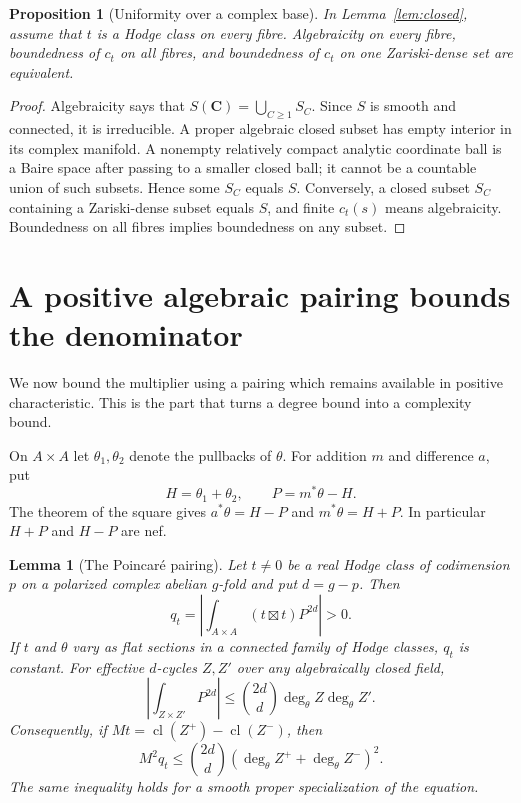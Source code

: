 \documentclass[11pt]{article}
\newtheorem{proposition}[theorem]{Proposition}
\newtheorem{lemma}[theorem]{Lemma}
\theoremstyle{definition}
\theoremstyle{remark}
\newcommand{\C}{\mathbf C}
\newcommand{\cl}{\operatorname{cl}}
\begin{document}
\begin{proposition}[Uniformity over a complex base]\label{prop:complex}
In Lemma~\ref{lem:closed}, assume that $t$ is a Hodge class on every fibre. Algebraicity on every fibre, boundedness of $c_t$ on all fibres, and boundedness of $c_t$ on one Zariski-dense set are equivalent.
\end{proposition}

\begin{proof}
Algebraicity says that $S(\C)=\bigcup_{C\geq1}S_C$. Since $S$ is smooth and connected, it is irreducible. A proper algebraic closed subset has empty interior in its complex manifold. A nonempty relatively compact analytic coordinate ball is a Baire space after passing to a smaller closed ball; it cannot be a countable union of such subsets. Hence some $S_C$ equals $S$. Conversely, a closed subset $S_C$ containing a Zariski-dense subset equals $S$, and finite $c_t(s)$ means algebraicity. Boundedness on all fibres implies boundedness on any subset.
\end{proof}

\section{A positive algebraic pairing bounds the denominator}
\label{sec:positive}

We now bound the multiplier using a pairing which remains available in positive characteristic. This is the part that turns a degree bound into a complexity bound.

On $A\times A$ let $\theta_1,\theta_2$ denote the pullbacks of $\theta$. For addition $m$ and difference $a$, put
\[
 H=\theta_1+\theta_2,\qquad P=m^*\theta-H.
\]
The theorem of the square gives $a^*\theta=H-P$ and $m^*\theta=H+P$. In particular $H+P$ and $H-P$ are nef.

\begin{lemma}[The Poincar\'e pairing]\label{lem:positive}
Let $t\ne0$ be a real Hodge class of codimension $p$ on a polarized complex abelian $g$-fold and put $d=g-p$. Then
\[
 q_t=\left|\int_{A\times A}(t\boxtimes t)P^{2d}\right|>0.
\]
If $t$ and $\theta$ vary as flat sections in a connected family of Hodge classes, $q_t$ is constant. For effective $d$-cycles $Z,Z'$ over any algebraically closed field,
\begin{equation}\label{eq:nef}
 \left|\int_{Z\times Z'}P^{2d}\right|
 \leq \binom{2d}{d}\deg_\theta Z\deg_\theta Z'.
\end{equation}
Consequently, if $Mt=\cl(Z^+)-\cl(Z^-)$, then
\begin{equation}\label{eq:denominator}
 M^2q_t\leq \binom{2d}{d}
       (\deg_\theta Z^++\deg_\theta Z^-)^2.
\end{equation}
The same inequality holds for a smooth proper specialization of the equation.
\end{lemma}
\end{document}
